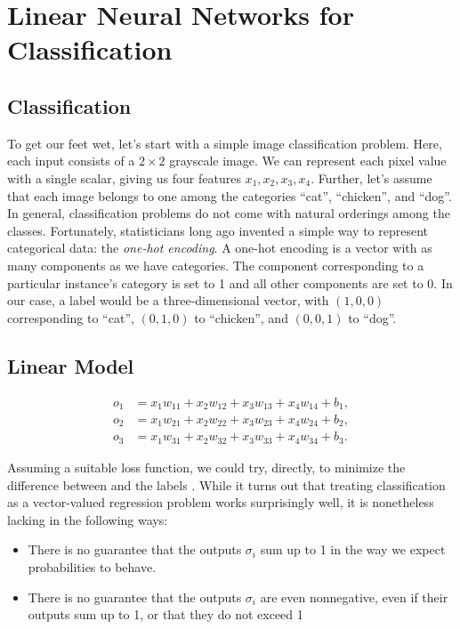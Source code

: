 \documentclass[a4paper,12pt]{article}
\theoremstyle{definition}
\begin{document}
\section{Linear Neural Networks for Classification}

\subsection*{Classification}
To get our feet wet, let's start with a simple image classification problem. Here, each input consists of a $2\times2$
grayscale image. We can represent each pixel value with a single scalar, giving us four features $x_1, x_2, x_3, x_4$.
Further, let's assume that each image belongs to one among the categories “cat”, “chicken”, and “dog”.
\newline
In general, classification problems do not come with natural orderings among the classes. Fortunately, statisticians long ago invented a
simple way to represent categorical data: the \emph{one-hot encoding}. A one-hot encoding is a vector with as many components as we have
categories. The component corresponding to a particular instance’s category is set to 1 and all other components are set to 0. In our case,
a label would be a three-dimensional vector, with $(1,0,0)$ corresponding to “cat”, $(0,1,0)$ to “chicken”, and $(0,0,1)$ to “dog”.
\subsection*{Linear Model}
\begin{equation*}
    \begin{aligned}
        o_1 & = x_1 w_{11} + x_2 w_{12} + x_3 w_{13} + x_4 w_{14} + b_1, \\
        o_2 & = x_1 w_{21} + x_2 w_{22} + x_3 w_{23} + x_4 w_{24} + b_2, \\
        o_3 & = x_1 w_{31} + x_2 w_{32} + x_3 w_{33} + x_4 w_{34} + b_3.
    \end{aligned}
\end{equation*}


Assuming a suitable loss function, we could try, directly, to minimize the difference between
and the labels
. While it turns out that treating classification as a vector-valued regression problem works surprisingly well, it is nonetheless lacking in the following ways:
\begin{itemize}
    \item There is no guarantee that the outputs $\sigma_i$ sum up to 1 in the way we expect probabilities to behave.
    \item There is no guarantee that the outputs $\sigma_i$ are even nonnegative, even if their outputs sum up to 1, or that they do not exceed 1
\end{itemize}
\end{document}
